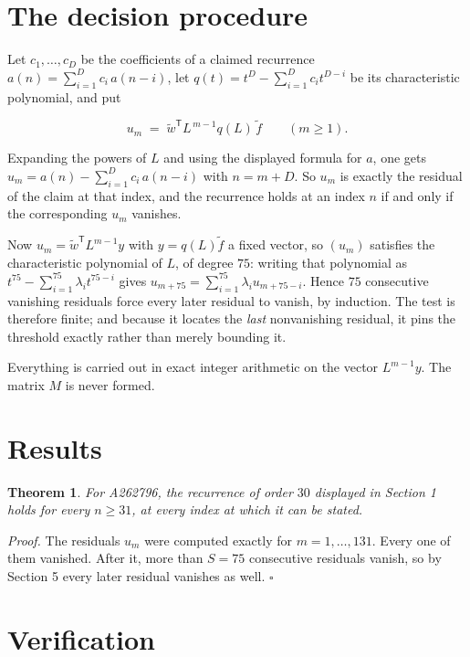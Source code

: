 \documentclass[11pt]{article}
\newtheorem{theorem}{Theorem}
\theoremstyle{definition}
\begin{document}
\section{The decision procedure}

Let $c_1,\dots,c_D$ be the coefficients of a claimed recurrence $a(n) = \sum_{i=1}^{D} c_i\,a(n-i)$, let $q(t) = t^{D} - \sum_{i=1}^{D} c_i t^{D-i}$ be its characteristic polynomial, and put

\[u_m \;=\; \tilde w^{\mathsf T} L^{\,m-1} q(L)\,\tilde f \qquad (m \ge 1).\]

Expanding the powers of $L$ and using the displayed formula for $a$, one gets $u_m = a(n) - \sum_{i=1}^{D} c_i\,a(n-i)$ with $n = m + D$. So $u_m$ is exactly the residual of the claim at that index, and the recurrence holds at an index $n$ if and only if the corresponding $u_m$ vanishes.

Now $u_m = \tilde w^{\mathsf T} L^{m-1} y$ with $y = q(L)\tilde f$ a fixed vector, so $(u_m)$ satisfies the characteristic polynomial of $L$, of degree $75$: writing that polynomial as $t^{75} - \sum_{i=1}^{75} \lambda_i t^{75-i}$ gives $u_{m+75} = \sum_{i=1}^{75} \lambda_i u_{m+75-i}$. Hence $75$ consecutive vanishing residuals force every later residual to vanish, by induction. The test is therefore finite; and because it locates the {\itshape last} nonvanishing residual, it pins the threshold exactly rather than merely bounding it.

Everything is carried out in exact integer arithmetic on the vector $L^{m-1}y$. The matrix $M$ is never formed.

\section{Results}

\begin{theorem} For A262796, the recurrence of order $30$ displayed in Section 1 holds for every $n \ge 31$, at every index at which it can be stated.\end{theorem}

{\itshape Proof.} The residuals $u_m$ were computed exactly for $m = 1,\dots,131$. Every one of them vanished. After it, more than $S = 75$ consecutive residuals vanish, so by Section 5 every later residual vanishes as well. $\square$

\section{Verification}
\end{document}

